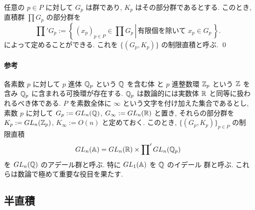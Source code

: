 \documentclass[12pt,twoside]{jarticle}
\def\Z{{\Bbb Z}} %
\def\Q{{\Bbb Q}} %
\def\R{{\Bbb R}} %
\begin{document}
\begin{question}[制限直積]
  任意の $p\in P$ に対して $G_p$ は群であり, $K_p$ はその部分群であるとする.
  このとき, 直積群 $\prod G_p$ の部分群を
  \begin{equation*}
    \prod\nolimits' G_p
    := \left\{\, \left. (x_p)_{p\in P} \in \prod G_p \,\right|\,
                 \text{有限個を除いて $x_p\in G_p$} \,\right\}.
  \end{equation*}
  によって定めることができる. これを $\{(G_p,K_p)\}$ の制限直積と呼ぶ. \qed
\end{question}

\paragraph{参考} 各素数 $p$ に対して $p$ 進体 $\Q_p$ という $\Q$ を含む体
と $p$ 進整数環 $\Z_p$ という $\Z$ を含み $\Q_p$ に含まれる可換環が存在する. 
$\Q_p$ は数論的には実数体 $\R$ と同等に扱われるべき体である.
$P$ を素数全体に $\infty$ という文字を付け加えた集合であるとし,
素数 $p$ に対して $G_p := GL_n(\Q)$, $G_\infty := GL_n(\R)$ と置き,
それらの部分群を $K_p := GL_n(\Z_p)$, $K_\infty := O(n)$ と定めておく.
このとき, $\{(G_p, K_p)\}_{p\in P}$ の制限直積
\begin{equation*}
  GL_n({\Bbb A}) = GL_n(\R) \times \prod\nolimits'GL_n(\Q_p)
\end{equation*}
を $GL_n(\Q)$ のアデール群と呼ぶ.  特に $GL_1({\Bbb A})$ を $\Q$ のイデール
群と呼ぶ.  これらは数論で極めて重要な役目を果たす.


\subsection{半直積}
\label{sec:semi-direct-product}
\end{document}
